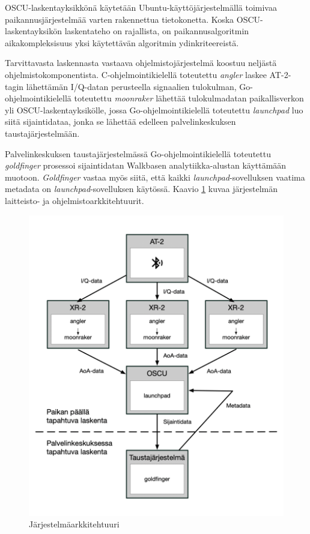 \documentclass[
  12pt,
  a4paper, twoside]{book}
\begin{document}
OSCU-laskentayksikkönä käytetään Ubuntu-käyttöjärjestelmällä toimivaa paikannusjärjestelmää varten rakennettua tietokonetta. Koska OSCU-laskentayksikön laskentateho on rajallista, on paikannusalgoritmin aikakompleksisuus yksi käytettävän algoritmin ydinkriteereistä.

Tarvittavasta laskennasta vastaava ohjelmistojärjestelmä koostuu neljästä ohjelmistokomponentista. C-ohjelmointikielellä toteutettu \emph{angler} laskee AT-2-tagin lähettämän I/Q-datan perusteella signaalien tulokulman, Go-ohjelmointikielellä toteutettu \emph{moonraker} lähettää tulokulmadatan paikallisverkon yli OSCU-laskentayksikölle, jossa Go-ohjelmointikielellä toteutettu \emph{launchpad} luo siitä sijaintidataa, jonka se lähettää edelleen palvelinkeskuksen taustajärjestelmään.

Palvelinkeskuksen taustajärjestelmässä Go-ohjelmointikielellä toteutettu \emph{goldfinger} prosessoi sijaintidatan Walkbasen analytiikka-alustan käyttämään muotoon. \emph{Goldfinger} vastaa myös siitä, että kaikki \emph{launchpad}-sovelluksen vaatima metadata on \emph{launchpad}-sovelluksen käytössä. Kaavio \ref{fig:jarjestelmaarkkitehtuuri} kuvaa järjestelmän laitteisto- ja ohjelmistoarkkitehtuurit.

\begin{figure}[H]
\centering
\includegraphics[width=15cm]{jarjestelmaarkkitehtuuri}
\caption{Järjestelmäarkkitehtuuri}
\label{fig:jarjestelmaarkkitehtuuri}
\end{figure}
\end{document}
